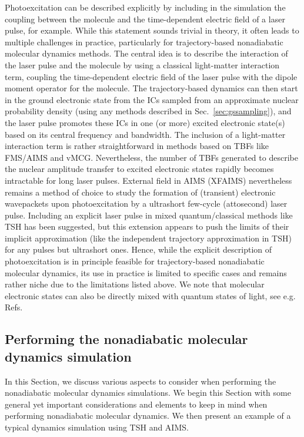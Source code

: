\documentclass[9pt,bestpractices]{livecoms}
\begin{document}
Photoexcitation can be described explicitly by including in the simulation the coupling between the molecule and the time-dependent electric field of a laser pulse, for example. While this statement sounds trivial in theory, it often leads to multiple challenges in practice, particularly for trajectory-based nonadiabatic molecular dynamics methods. The central idea is to describe the interaction of the laser pulse and the molecule by using a classical light-matter interaction term, coupling the time-dependent electric field of the laser pulse with the dipole moment operator for the molecule. The trajectory-based dynamics can then start in the ground electronic state from the ICs sampled from an approximate nuclear probability density (using any methods described in Sec.~\ref{sec:gssampling}), and the laser pulse promotes these ICs in one (or more) excited electronic state(s) based on its central frequency and bandwidth. 
The inclusion of a light-matter interaction term is rather straightforward in methods based on TBFs like FMS/AIMS and vMCG.\cite{mignolet2016communication,penfold2019excited} Nevertheless, the number of TBFs generated to describe the nuclear amplitude transfer to excited electronic states rapidly becomes intractable for long laser pulses. External field in AIMS (XFAIMS) nevertheless remains a method of choice to study the formation of (transient) electronic wavepackets upon photoexcitation by a ultrashort few-cycle (attosecond) laser pulse.\cite{mignolet2016communication,mignolet2018walk,mignolet2019steering,mignolet2019sub} Including an explicit laser pulse in mixed quantum/classical methods like TSH has been suggested,\cite{mitric2009c,tavernelli2010mixed,richter2011sharc} but this extension appears to push the limits of their implicit approximation (like the independent trajectory approximation in TSH) for any pulses but ultrashort ones.\cite{bajo2014interplay,mignolet2019excited} Hence, while the explicit description of photoexcitation is in principle feasible for trajectory-based nonadiabatic molecular dynamics, its use in practice is limited to specific cases and remains rather niche due to the limitations listed above. We note that molecular electronic states can also be directly mixed with quantum states of light, see e.g. Refs.~ 


\subsection{Performing the nonadiabatic molecular dynamics simulation}
\label{sec:performingNAMD}
In this Section, we discuss various aspects to consider when performing the nonadiabatic molecular dynamics simulations. We begin this Section with some general yet important considerations and elements to keep in mind when performing nonadiabatic molecular dynamics. We then present an example of a typical dynamics simulation using TSH and AIMS.
\end{document}
